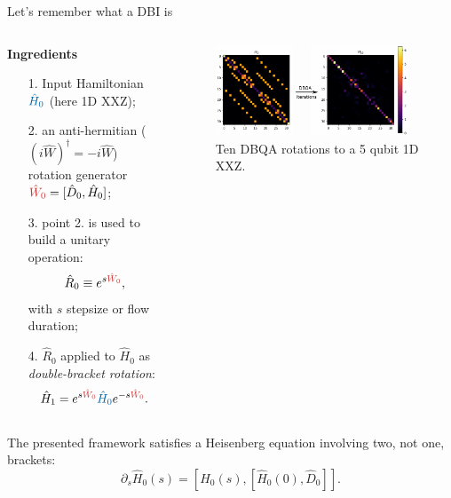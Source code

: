 \documentclass[aspectratio=169, 8pt, xcolor={svgnames}]{beamer}
\begin{document}
\begin{frame}{Let's remember what a DBI is}
\begin{columns}[T,onlytextwidth]
    \begin{column}{0.45\textwidth}
    \textbf{Ingredients}
        \begin{itemize}[noitemsep]
            \item[1.] Input Hamiltonian $\textcolor{mediumpersianblue}{\hat H_0}$ (here 1D XXZ);
            \item[2.] an anti-hermitian ($(i\hat{W})^{\dagger} = -i\hat{W}$) rotation generator $\textcolor{persianred}{\hat{W}_0} = [\hat{D}_0, \hat H_0]$;
            \item[3.] point 2. is used to build a unitary operation:
              $$ \hat{R}_0 \equiv e^{s \textcolor{persianred}{\hat{W}_0}}, $$
              with $s$ stepsize or flow duration;
            \item[4.] $\hat{R}_0$ applied to $\hat{H}_0$ as \textit{double-bracket rotation}:
               $$ \hat H_1 =  e^{s\textcolor{persianred}{\hat{W}_0}} \textcolor{mediumpersianblue}{\hat H_0} e^{- s \textcolor{persianred}{\hat{W}_0}}.$$
        \end{itemize}

    \end{column}

    \begin{column}{0.55\textwidth}
        \begin{figure}
           \includegraphics[width=0.95\textwidth]{figures/dbqa_10steps.pdf}
        \caption{Ten DBQA rotations to a 5 qubit 1D XXZ.}
        \end{figure}
    \end{column}
\end{columns}
\begin{tcolorbox}[colback=red!15, title=Nomenclature reason]
The presented framework satisfies a Heisenberg equation involving two, not one, brackets:
$$ \partial_s \hat{H}_0(s) = [ \hat{H}_0(s), [ \hat{H}_0(0), \hat{D}_0 ] ]. $$
\end{tcolorbox}
\end{frame}
\end{document}
